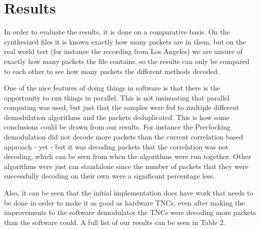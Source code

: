 \chapter{Results}

In order to evaluate the results, it is done on a comparative basis. On the synthesized files it is known exactly how many packets are in them, but on the real world test (for instance the recording from Los Angeles) we are unsure of exactly how many packets the file contains, so the results can only be compared to each other to see how many packets the different methods decoded.

One of the nice features of doing things in software is that there is the opportunity to run things in parallel. This is not insinuating that parallel computing was used, but just that the samples were fed to multiple different demodulation algorithms and the packets deduplicated. This is how some conclusions could be drawn from our results. For instance the Preclocking demodulation did not decode more packets than the current correlation based approach - yet - but it was decoding packets that the correlation was not decoding, which can be seen from when the algorithms were run together. Other algorithms were just ran standalone since the number of packets that they were successfully decoding on their own were a significant percentage less.

Also, it can be seen that the initial implementation does have work that needs to be done in order to make it as good as hardware TNCs, even after making the improvements to the software demodulator the TNCs were decoding more packets than the software could. A full list of our results can be seen in Table 2.
